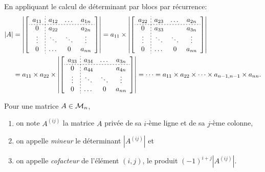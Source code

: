 \proof
En appliquant le calcul de déterminant par blocs par récurrence:
\begin{align*}
  |A| 
  & = 
  \left|\left[\begin{array}{c;{2pt/2pt}ccc}
                a_{11} & a_{12} & \dots & a_{1n} \\
                \hdashline[2pt/2pt]
                0 & a_{22} &  & a_{2n} \\
                \vdots  & \ddots & \ddots & \vdots \\
                0 & \dots & 0 & a_{nn} \\
              \end{array}\right]\right| 
  = a_{11} \times 
  \left|\left[\begin{array}{c;{2pt/2pt}ccc}
                a_{22} & a_{23} & \dots & a_{2n} \\
                \hdashline[2pt/2pt]
                0 & a_{33} &  & a_{3n} \\
                \vdots & \ddots & \ddots & \vdots \\
                0 & \dots & 0 & a_{nn} \\
              \end{array}\right]\right| \\
  & = a_{11} \times a_{22} \times 
  \left|\left[\begin{array}{c;{2pt/2pt}ccc}
                a_{33} & a_{34} & \dots & a_{3n} \\
                \hdashline[2pt/2pt]
                0 & a_{44} &  & a_{4n} \\
                \vdots  & \ddots & \ddots & \vdots \\
                0 & \dots & 0 & a_{nn} \\
              \end{array}\right]\right| 
  = \dots = a_{11} \times a_{22} \times \dots \times a_{n-1, n-1} \times a_{nn}.
\end{align*}
\eproof

\begin{definition} \label{def:mineurCofacteur}
  Pour une matrice $A \in \mathcal{M}_n$, 
  \begin{enumerate}[\itemdot]
   \item on note $A^{(ij)}$ la matrice $A$ privée de sa $i$-ème ligne et de sa $j$-ème colonne,
   \item on appelle {\em mineur} le déterminant $|A^{(ij)}|$ et
   \item on appelle {\em cofacteur} de l'élément $(i, j)$, le produit $(-1)^{i+j} |A^{(ij)}|$.
  \end{enumerate}
\end{definition}

